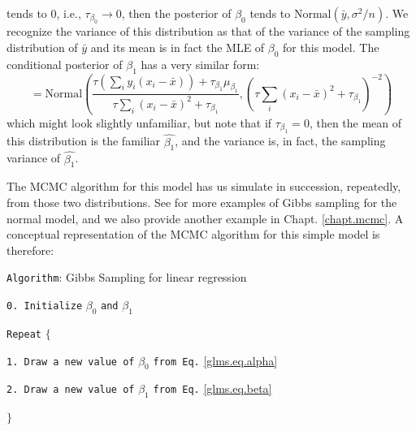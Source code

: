tends to 0, i.e., $\tau_{\beta_0} \rightarrow 0$, then the posterior of
$\beta_0$ tends to  $\mbox{Normal}(\bar{y}, \sigma^{2}/n)$. We recognize the 
variance of this distribution as that of the variance of the sampling
distribution of $\bar{y}$ and its mean is in fact the MLE of $\beta_0$
for this model. 
The conditional posterior of $\beta_1$ has a very similar form:
\begin{equation}
 [\beta_1|y,\beta_0]  = \mbox{Normal}\left(
\frac{ \tau (\sum_{i} y_{i}(x_{i}-\bar{x}) ) + \tau_{\beta_1} \mu_{\beta_1}}
{ \tau \sum_{i} (x_{i}-\bar{x})^{2} + \tau_{\beta_1}},
(\tau \sum_{i} (x_{i}-\bar{x})^{2} + \tau_{\beta_1} )^{-2} \right)
\label{glms.eq.beta}
\end{equation}
which might look slightly unfamiliar, but note that if $\tau_{\beta_1} = 0$, 
then the mean of this distribution is the familiar $\hat{\beta_1}$, and
the variance is, in fact, the sampling variance of $\hat{\beta_1}$. 

The MCMC algorithm for this model has us simulate in succession,
repeatedly, from those two distributions. See \citet{gelman_etal:2004}
for more examples of Gibbs sampling for the normal model, and we also
provide another example in Chapt. \ref{chapt.mcmc}. A
conceptual representation of the MCMC algorithm for this simple model
is therefore:

\vspace{.1in}

\parbox[h]{6in}{
{\tt Algorithm}: Gibbs Sampling for linear regression

\vspace{.1in}

\hspace{.25in}
     {\tt  0. Initialize} $\beta_0$ {\tt and} $\beta_1$

\vspace{.1in}


\hspace{.25in}
     {\tt  Repeat} $\{$

\vspace{.1in}
   
\hspace{.45in}
        {\tt 1. Draw a new value of} $\beta_0$ {\tt from Eq.} \ref{glms.eq.alpha}

\vspace{.1in}

\hspace{.45in}
        {\tt 2. Draw a new value of} $\beta_1$  {\tt from Eq.} \ref{glms.eq.beta}

\vspace{.1in}

\hspace{.25in}
     $\}$
}

